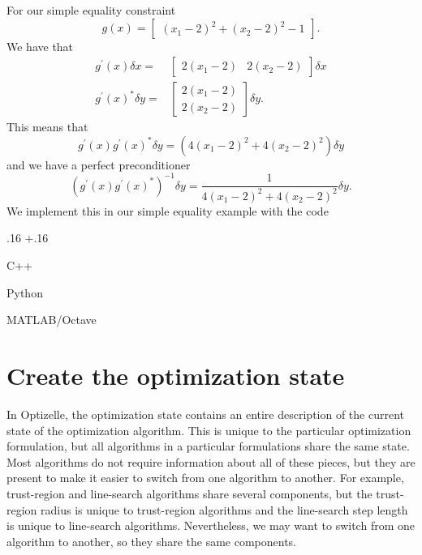 \documentclass{report}
\newenvironment{boldlist}
    {\begin{list}{}{
        \labelwidth.16\textwidth
        \leftmargin\dimexpr\leftmargin+.16\textwidth
        \renewcommand\makelabel[1]{%
            \textbf{##1}}}}
    {\vspace{-\dimexpr\baselineskip+2\itemsep}\end{list}}
\newcommand{\exampleitem}[2]{
    \item[Language] #1
    \item[Code] #2
    \item[]}
\newcommand{\secstate}{Create the optimization state}
\begin{document}
        For our simple equality constraint
$$
    g(x)=\begin{bmatrix}
        (x_1-2)^2 + (x_2-2)^2 - 1
    \end{bmatrix}.
$$
We have that
\begin{align*}
    g^\prime(x)\delta x=&\begin{bmatrix}
        2(x_1-2) & 2(x_2-2)
    \end{bmatrix}\delta x\\
    g^\prime(x)^*\delta y=&
        \begin{bmatrix}
            2(x_1-2)\\
            2(x_2-2)
        \end{bmatrix} \delta y.
\end{align*}
This means that
$$
        g^\prime(x)g^\prime(x)^*\delta y=(4(x_1-2)^2+4(x_2-2)^2)\delta y
$$
and we have a perfect preconditioner
$$
        (g^\prime(x)g^\prime(x)^*)^{-1}\delta y=\frac{1}{4(x_1-2)^2+4(x_2-2)^2}\delta y.
$$
We implement this in our simple equality example with the code
\begin{boldlist}
    \exampleitem
        {C++}
        {}

    \exampleitem
        {Python}
        {}

    \exampleitem
        {MATLAB/Octave}
        {}
\end{boldlist}

\section{\secstate}\label{sec:state}

        In Optizelle, the optimization state contains an entire description of the current state of the optimization algorithm.  This is unique to the particular optimization formulation, but all algorithms in a particular formulations share the same state.  Most algorithms do not require information about all of these pieces, but they are present to make it easier to switch from one algorithm to another.  For example, trust-region and line-search algorithms share several components, but the trust-region radius is unique to trust-region algorithms and the line-search step length is unique to line-search algorithms.  Nevertheless, we may want to switch from one algorithm to another, so they share the same components.
\end{document}
